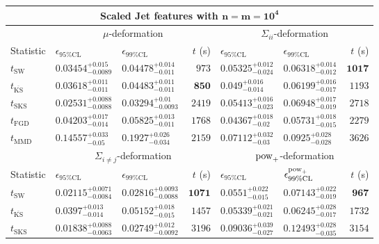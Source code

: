 \begin{tabular}{l|llr|llr}
	\toprule
	\multicolumn{7}{c}{{\bf Scaled Jet features with $\mathbf{n=m=10^{4}}$}} \\
	\toprule
	\multicolumn{1}{c}{} & \multicolumn{3}{c}{$\mu$-deformation} & \multicolumn{3}{c}{$\Sigma_{ii}$-deformation} \\
	Statistic & $\epsilon_{95\%\mathrm{CL}}$ & $\epsilon_{99\%\mathrm    {CL}}$ & $t$ (s) & $\epsilon_{95\%\mathrm{CL}}$ & $\epsilon_{99\%\mathrm{CL}}$ & $t$ (s) \\
	\midrule
	$t_{\mathrm{SW}}$ & $0.03454_{-0.0089}^{+0.015}$ & $0.04478_{-0.011}^{+0.014}$ & $973$ & $0.05325_{-0.024}^{+0.012}$ & $0.06318_{-0.012}^{+0.014}$ & ${\mathbf{1017}}$ \\
	$t_{\overline{\mathrm{KS}}}$ & $0.03618_{-0.011}^{+0.011}$ & $0.04483_{-0.011}^{+0.011}$ & ${\mathbf{850}}$ & $0.049_{-0.014}^{+0.016}$ & $0.06199_{-0.017}^{+0.016}$ & $1193$ \\
	$t_{\mathrm{SKS}}$ & ${\mathbf{0.02531_{-0.0088}^{+0.0088}}}$ & ${\mathbf{0.03294_{-0.0093}^{+0.01}}}$ & $2419$ & $0.05413_{-0.023}^{+0.016}$ & $0.06948_{-0.019}^{+0.017}$ & $2718$ \\
	$t_{\mathrm{FGD}}$ & $0.04203_{-0.014}^{+0.017}$ & $0.05825_{-0.011}^{+0.013}$ & $1768$ & ${\mathbf{0.04367_{-0.02}^{+0.018}}}$ & ${\mathbf{0.05731_{-0.015}^{+0.018}}}$ & $2279$ \\
	$t_{\mathrm{MMD}}$ & $0.14557_{-0.05}^{+0.033}$ & $0.1927_{-0.034}^{+0.026}$ & $2159$ & $0.07112_{-0.03}^{+0.032}$ & $0.0925_{-0.028}^{+0.028}$ & $3626$ \\
	\toprule
	\multicolumn{1}{c}{} & \multicolumn{3}{c}{$\Sigma_{i\neq j}$-deformation} & \multicolumn{3}{c}{$\rm{pow}_{+}$-deformation} \\
	Statistic & $\epsilon_{95\%\mathrm{CL}}$ & $\epsilon_{99\%\mathrm{CL}}$ & $t$ (s) & $\epsilon_{95\%\mathrm{CL}}$ & $\epsilon^{\rm   {pow}_{+}}_{99\%\mathrm{CL}}$ & $t$ (s) \\
	\midrule
	$t_{\mathrm{SW}}$ & $0.02115_{-0.0084}^{+0.0071}$ & $0.02816_{-0.0088}^{+0.0093}$ & ${\mathbf{1071}}$ & $0.0551_{-0.015}^{+0.022}$ & $0.07143_{-0.019}^{+0.022}$ & ${\mathbf{967}}$ \\
	$t_{\overline{\mathrm{KS}}}$ & $0.0397_{-0.014}^{+0.013}$ & $0.05152_{-0.015}^{+0.018}$ & $1457$ & $0.05339_{-0.021}^{+0.021}$ & $0.06245_{-0.017}^{+0.028}$ & $1732$ \\
	$t_{\mathrm{SKS}}$ & $0.01838_{-0.0063}^{+0.0088}$ & $0.02749_{-0.0092}^{+0.012}$ & $3196$ & $0.09036_{-0.027}^{+0.039}$ & $0.12493_{-0.035}^{+0.028}$ & $3154$ \\

\end{tabular}
